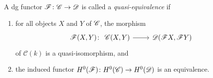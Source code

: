 \documentclass[dissertation.tex]{subfiles}
\begin{document}

\begin{defn}
  A dg functor $\mathscr{F} \colon \mathscr{C} \rightarrow \mathscr{D}$ is called a {\it quasi-equivalence} if 
  \begin{enumerate}
  \item
    for all objects $X$ and $Y$ of $\mathscr{C}$, the morphism
    $$\mathscr{F}(X,Y) \colon
    \begin{tikzcd}
      \CC(X,Y) \arrow{r} & \D(\mathscr{F}X,\mathscr{F}Y)
    \end{tikzcd}$$
    of $\mathcal{C}(k)$ is a quasi-isomorphism, and
  \item
    the induced functor $H^0(\mathscr{F}) \colon H^0(\mathscr{C}) \rightarrow H^0(\mathscr{D})$ is an equivalence.
  \end{enumerate}
\end{defn}
\end{document}
